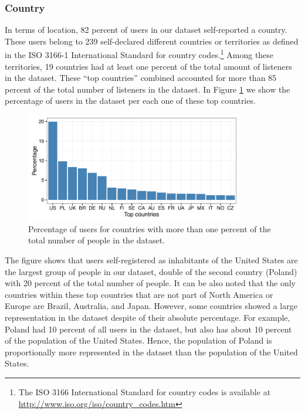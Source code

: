 \subsubsection{Country}
In terms of location, 82 percent of users in our dataset self-reported a country.
These users belong to 239 self-declared different countries or territories as defined in the ISO 3166-1 International Standard for country codes.\footnote{The ISO 3166 International Standard for country codes is available at \url{http://www.iso.org/iso/country_codes.htm}}
Among these territories, 19 countries had at least one percent of the total amount of listeners in the dataset. These ``top countries'' combined accounted for more than 85 percent of the total number of listeners in the dataset. In Figure \ref{fig:6_listeners_per_country} we show the percentage of users in the dataset per each one of these top countries.

\begin{figure}[!h]
\centering
\includegraphics[width=0.85\textwidth]{6_listeners_per_country_2.pdf}				
\caption[Percentage of users for top countries in the dataset]{Percentage of users for countries with more than one percent of the total number of people in the dataset.}
\label{fig:6_listeners_per_country}
\end{figure} 

The figure shows that users self-registered as inhabitants of the United States are the  largest group of people in our dataset, double of the second country (Poland) with 20 percent of the total number of people. It can be also noted that the only countries within these top countries that are not part of North America or Europe are Brazil, Australia, and Japan. 
However, some countries showed a large representation in the dataset despite of their absolute percentage. For example, Poland had 10 percent of all users in the dataset, but also has about 10 percent of the population of the United States. Hence, the population of Poland is proportionally more represented in the dataset than the population of the United States.


